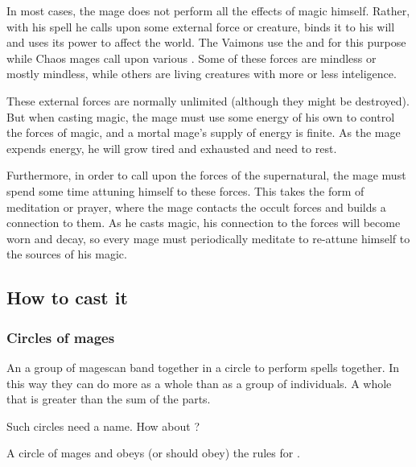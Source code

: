 In most cases, the mage does not perform all the effects of magic himself. 
Rather, with his spell he calls upon some external force or creature, binds it to his will and uses its power to affect the world. 
The Vaimons use the \Sephiroth{} and \Kliffoth{} for this purpose while Chaos mages call upon various . 
Some of these forces are mindless or mostly mindless, while others are living creatures with more or less inteligence.

These external forces are normally unlimited (although they might be destroyed). 
But when casting magic, the mage must use some energy of his own to control the forces of magic, and a mortal mage's supply of energy is finite. 
As the mage expends energy, he will grow tired and exhausted and need to rest. 

Furthermore, in order to call upon the forces of the supernatural, the mage must spend some time attuning himself to these forces. 
This takes the form of meditation or prayer, where the mage contacts the occult forces and builds a connection to them. 
As he casts magic, his connection to the forces will become worn and decay, so every mage must periodically meditate to re-attune himself to the sources of his magic. 









\subsection{How to cast it}





\subsubsection{Circles of mages}
An \dash a group of mages\dash can band together in a circle to perform spells together. In this way they can do more as a whole than as a group of individuals. A whole that is greater than the sum of the parts. 

Such circles need a name. How about ?

A circle of mages  and obeys (or should obey) the rules for \matrices. 





